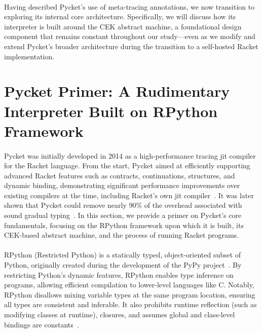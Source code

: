        \paragraph{}%
            Having described Pycket’s use of meta-tracing annotations, we now transition to exploring its internal core architecture. Specifically, we will discuss how its interpreter is built around the CEK abstract machine, a foundational design component that remains constant throughout our study—even as we modify and extend Pycket’s broader architecture during the transition to a self-hosted Racket implementation.

    \section[\texorpdfstring{Pycket Primer: A Rudimentary Interpreter Built on RPython Framework}{Pycket Primer}]{Pycket Primer: A Rudimentary Interpreter Built on RPython Framework}
        \label{section:pycket-primer}

        \paragraph{}%
            Pycket was initially developed in 2014 as a high-performance tracing \gls{jit} compiler for the Racket language. From the start, Pycket aimed at efficiently supporting advanced Racket features such as contracts, continuations, structures, and dynamic binding, demonstrating significant performance improvements over existing compilers at the time, including Racket's own \gls{jit} compiler~\cite{pycketmain}. It was later shown that Pycket could remove nearly 90\% of the overhead associated with sound gradual typing~\cite{pycketmain2}. In this section, we provide a primer on Pycket's core fundamentals, focusing on the RPython framework upon which it is built, its CEK-based abstract machine, and the process of running Racket programs.

        \paragraph{}%
            RPython (Restricted Python) is a statically typed, object-oriented subset of Python, originally created during the development of the PyPy project~\cite{pypy06}. By restricting Python’s dynamic features, RPython enables type inference on programs, allowing efficient compilation to lower-level languages like C. Notably, RPython disallows mixing variable types at the same program location, ensuring all types are consistent and inferable. It also prohibits runtime reflection (such as modifying classes at runtime), closures, and assumes global and class-level bindings are constants~\cite{rpython07,rpython09}.

